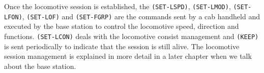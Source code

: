 \begin{table}[ht!]
    \centering 
\end{table}

Once the locomotive session is established, the \texttt{(SET-LSPD)}, \texttt{(SET-LMOD)}, \texttt{(SET-LFON)}, \texttt{(SET-LOF)} and \texttt{(SET-FGRP)} are the commands sent by a cab handheld and executed by the base station to control the locomotive speed, direction and functions. \texttt{(SET-LCON)} deals with the locomotive consist management and \texttt{(KEEP)} is sent periodically to indicate that the session is still alive. The locomotive session management is explained in more detail in a later chapter when we talk about the base station.

\begin{table}[ht!]
    \centering 
\end{table}

